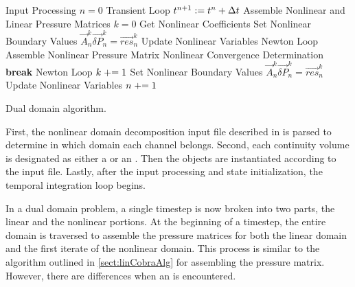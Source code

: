 \begin{algo}[ht!]
\setlength{\baselineskip}{0.625\baselineskip}
\begin{algorithmic}[1]
\Require Input Processing
\Set $n = 0$
\Loop \; Transient Loop
    \Set $t^{n+1} : = t^{n} + \dt{}$
	\Algorithm Assemble Nonlinear and Linear Pressure Matrices	 
	    \Set $k = 0$
		\Algorithm Get Nonlinear Coefficients 
		\Algorithm Set Nonlinear Boundary Values 
		\Solve $\vec{A}^{k}_{n} \vec{\delta P}_{n}^{k} = \vec{res}_{n}^{k}$	
		\Algorithm Update Nonlinear Variables  
	    \Loop \; Newton Loop
			\Algorithm Assemble Nonlinear Pressure Matrix 
			\Algorithm Nonlinear Convergence Determination 
				\State \textbf{break} Newton Loop 
			\EndIf		
			\Set $k \mathrel{+}= 1$
			\Algorithm Set Nonlinear Boundary Values 
			\Solve $\vec{A}_{n}^{k} \vec{\delta P}_{n}^{k} = \vec{res}_{n}^{k}$
			\Algorithm Update Nonlinear Variables 
		\EndLoop
	\EndIf
	 
	\Set $n \mathrel{+}= 1$
\EndLoop
\end{algorithmic}
\caption{Dual domain \cobra{} algorithm.}
\label{alg:domDecompAlgorithm}
\end{algo}

First, the nonlinear domain decomposition input file described in  is parsed to determine in which domain each channel belongs.
Second, each continuity volume is designated as either a  or an .
Then the  objects are instantiated according to the \cobra{} input file.
Lastly, after the input processing and state initialization, the temporal integration loop begins.

In a dual domain problem, a single timestep is now broken into two parts, the linear and the nonlinear portions.
At the beginning of a timestep, the entire domain is traversed to assemble the pressure matrices for both the linear domain and the first iterate of the nonlinear domain.
This process is similar to the algorithm outlined in \ref{sect:linCobraAlg} for assembling the pressure matrix.
However, there are differences when an  is encountered.

